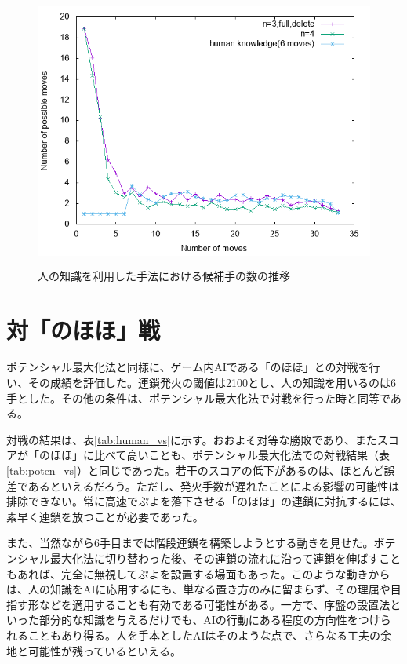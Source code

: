 \documentclass[12pt]{jreport}
\begin{document}
\begin{figure}[tbp]
  \begin{center}
  \includegraphics[height=9cm]{experiment/HumanKnowledge/human_tsumoList.png}
  \caption{人の知識を利用した手法における候補手の数の推移} \label{fig:human_tsumoList}
\end{center}
\end{figure}


\section{対「のほほ」戦}
ポテンシャル最大化法と同様に、ゲーム内AIである「のほほ」との対戦を行い、その成績を評価した。連鎖発火の閾値は2100とし、人の知識を用いるのは6手とした。その他の条件は、ポテンシャル最大化法で対戦を行った時と同等である。

対戦の結果は、表\ref{tab:human_vs}に示す。おおよそ対等な勝敗であり、またスコアが「のほほ」に比べて高いことも、ポテンシャル最大化法での対戦結果（表\ref{tab:poten_vs}）と同じであった。若干のスコアの低下があるのは、ほとんど誤差であるといえるだろう。ただし、発火手数が遅れたことによる影響の可能性は排除できない。常に高速でぷよを落下させる「のほほ」の連鎖に対抗するには、素早く連鎖を放つことが必要であった。

また、当然ながら6手目までは階段連鎖を構築しようとする動きを見せた。ポテンシャル最大化法に切り替わった後、その連鎖の流れに沿って連鎖を伸ばすこともあれば、完全に無視してぷよを設置する場面もあった。このような動きからは、人の知識をAIに応用するにも、単なる置き方のみに留まらず、その理屈や目指す形などを適用することも有効である可能性がある。一方で、序盤の設置法といった部分的な知識を与えるだけでも、AIの行動にある程度の方向性をつけられることもあり得る。人を手本としたAIはそのような点で、さらなる工夫の余地と可能性が残っているといえる。
\end{document}
